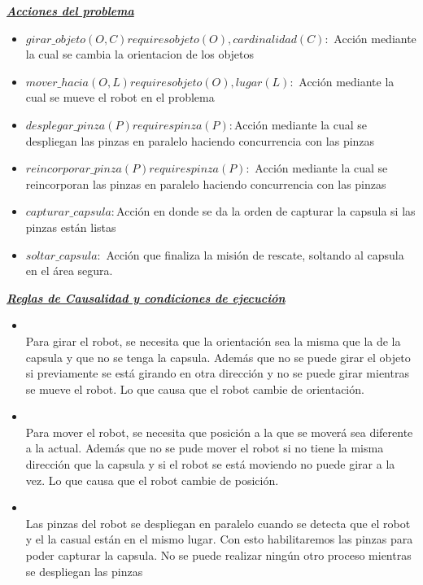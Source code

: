 \documentclass[letterpaper ,10pt]{article}
\begin{document}
{{\textbf{\noindent \ul{\textsl{Acciones del problema} }}
\begin{itemize}
\item $girar\_objeto(O,C) requires objeto(O), cardinalidad(C):$ Acción mediante la cual se cambia la orientacion de los objetos
\item $mover\_hacia(O, L) requires objeto(O), lugar(L):$  Acción mediante la cual se mueve el robot en el problema
\item $desplegar\_pinza(P) requires pinza(P):$Acción mediante la cual se despliegan las pinzas en paralelo haciendo concurrencia con las pinzas
\item $reincorporar\_pinza(P) requires pinza(P):$ Acción mediante la cual se reincorporan las pinzas en paralelo haciendo concurrencia con las pinzas
\item $capturar\_capsula:$Acción en donde se da la orden de capturar la capsula si las pinzas están listas
\item $soltar\_capsula:$ Acción que finaliza la misión de rescate, soltando al capsula en el área segura.
\end{itemize}



\vspace{1.8cm}
\textbf{\noindent \ul{\textsl{ Reglas de Causalidad y condiciones de ejecuci\'on } }}
\begin{itemize}

\item {}
\\
Para girar el robot, se necesita que la orientación sea la misma que la de la capsula y que no se tenga la capsula. Además que no se puede girar el objeto si previamente se está girando en otra dirección y no se puede girar mientras se mueve el robot. Lo que causa que el robot cambie de orientación.

\item {}
\\
Para mover el robot, se necesita que posición a la que se moverá sea diferente a  la actual. Además que no se pude mover el robot si no tiene la misma dirección que la capsula y si el robot se está moviendo no puede girar a la vez. Lo que causa que el robot cambie de posición.

\item {}
\\
Las pinzas del robot se despliegan en paralelo cuando se detecta que el robot y el la casual están en el mismo lugar. Con esto habilitaremos las pinzas para poder capturar la capsula. No se puede realizar ningún otro proceso mientras se despliegan las pinzas


\end{itemize}}}
\end{document}
